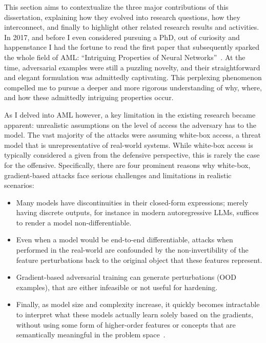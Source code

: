 This section aims to contextualize the three major contributions of this dissertation, explaining how they evolved into research questions, how they interconnect, and finally to highlight other related research results and activities.
In 2017, and before I even considered pursuing a PhD, out of curiosity and happenstance I had the fortune to read the first paper that subsequently sparked the whole field of \gls{AML}: ``Intriguing Properties of Neural Networks''~\cite{szegedy2013intriguing}.
At the time, adversarial examples were still a puzzling novelty, and their straightforward and elegant formulation was admittedly captivating.
This perplexing phenomenon compelled me to pursue a deeper and more rigorous understanding of why, where, and how these admittedly intriguing properties occur.

As I delved into \gls{AML} however, a key limitation in the existing research became apparent: unrealistic assumptions on the level of access the adversary has to the model.
The vast majority of the attacks were assuming white-box access, a threat model that is unrepresentative of real-world systems.
While white-box access is typically considered a given from the defensive perspective, this is rarely the case for the offensive.
Specifically, there are four prominent reasons why white-box, gradient-based attacks face serious challenges and limitations in realistic scenarios:

\begin{itemize}
    \item Many models have discontinuities in their closed-form expressions; merely having discrete outputs, for instance in modern autoregressive LLMs, suffices to render a model non-differentiable.
    \item Even when a model would be end-to-end differentiable, attacks when performed in the real-world are confounded by the non-invertibility of the feature perturbations back to the original object that these features represent.
    \item Gradient-based adversarial training can generate perturbations (\gls{OOD} examples), that are either infeasible or not useful for hardening.
    \item Finally, as model size and complexity increase, it quickly becomes intractable to interpret what these models actually learn solely based on the gradients, without using some form of higher-order features or concepts that are semantically meaningful in the problem space~\cite{kim2018interpretability}.
\end{itemize}

